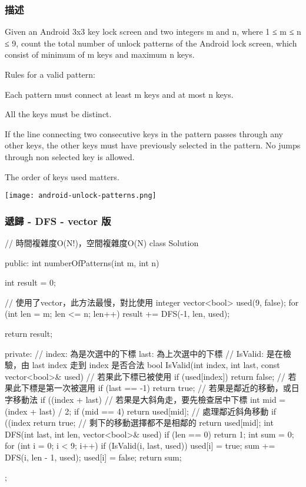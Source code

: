 \subsubsection{描述}
Given an Android 3x3 key lock screen and two integers m and n, where 1 ≤ m ≤ n ≤ 9, count the total number of unlock patterns of the Android lock screen, which consist of minimum of m keys and maximum n keys.

Rules for a valid pattern:
\begindot
\item Each pattern must connect at least m keys and at most n keys.
\item All the keys must be distinct.
\item If the line connecting two consecutive keys in the pattern passes through any other keys, the other keys must have previously selected in the pattern. No jumps through non selected key is allowed.
\item The order of keys used matters.
\myenddot

\begin{center}
\texttt{[image: android-unlock-patterns.png]}\\
\label{fig:android-unlock-patterns}
\end{center}

\subsubsection{遞歸 - DFS - vector 版}
\begin{Code}
// 時間複雜度O(N!)，空間複雜度O(N)
class Solution {
public:
    int numberOfPatterns(int m, int n) {
        int result = 0;

        // 使用了vector，此方法最慢，對比使用 integer
        vector<bool> used(9, false);
        for (int len = m; len <= n; len++)
            result += DFS(-1, len, used);

        return result;
    }
private:
    // index: 為是次選中的下標 last: 為上次選中的下標
    // IsValid: 是在檢驗，由 last index 走到 index 是否合法
    bool IsValid(int index, int last, const vector<bool>& used)
    {
        // 若果此下標已被使用
        if (used[index]) return false;
        // 若果此下標是第一次被選用
        if (last == -1) return true;
        // 若果是鄰近的移動，或日字移動法
        if ((index + last) %
        // 若果是大斜角走，要先檢查居中下標
        int mid = (index + last) / 2;
        if (mid == 4) return used[mid];
        // 處理鄰近斜角移動
        if ((index %
            return true;
        // 剩下的移動選擇都不是相鄰的
        return used[mid];
    }
    int DFS(int last, int len, vector<bool>& used)
    {
        if (len == 0)
            return 1;
        int sum = 0;
        for (int i = 0; i < 9; i++)
        {
            if (IsValid(i, last, used))
            {
                used[i] = true;
                sum += DFS(i, len - 1, used);
                used[i] = false;
            }
        }
        return sum;
    }
};
\end{Code}

